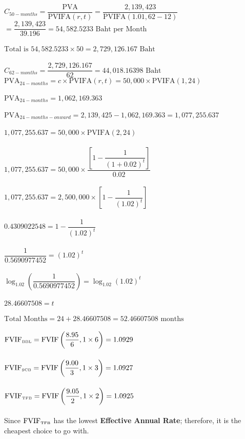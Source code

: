 \documentclass{article}
\begin{document}
\begin{outline}[enumerate]
\1 
	\2 
		$ C_{50-months} = \dfrac{\mbox{PVA}}{\mbox{PVIFA}(r, t)} = \dfrac{2,139,423}{\mbox{PVIFA}\left(1.01, 62 - 12 \right)} $
		$ 	= \dfrac{2,139,423}{39.196} = 54,582.5233 \mbox{ Baht per Month}$ \\\\
		$\mbox{Total is } 54,582.5233 \times 50 = 2,729,126.167 \mbox{ Baht}$ \\\\
		$ C_{62-months} = \dfrac{2,729,126.167}{62} = 44,018.16398 \mbox{ Baht} $
	\2 	$ \mbox{PVA}_{24-months} = c \times {\mbox{PVIFA}(r, t)} = 50,000 \times {\mbox{PVIFA}(1, 24)} $ \\\\
		$ \mbox{PVA}_{24-months} = 1,062,169.363 $ \\\\
		$ \mbox{PVA}_{24-months-onward} = 2,139,425 - 1,062,169.363 = 1,077,255.637 $ \\\\
		$ 1,077,255.637 = 50,000 \times {\mbox{PVIFA}(2, 24)} $ \\\\
		$ 1,077,255.637 = 50,000 \times \dfrac{\left[1 - \dfrac{1}{(1 + 0.02)^t}\right]}{0.02} $ \\\\
		$ 1,077,255.637 = 2,500,000 \times \left[1 - \dfrac{1}{(1.02)^t}\right] $ \\\\
		$ 0.4309022548 = 1 - \dfrac{1}{(1.02)^t} $ \\\\
		$ \dfrac{1}{0.5690977452} = (1.02)^t $ \\\\
		$ \log_{1.02}\left(\dfrac{1}{0.5690977452}\right) = \log_{1.02}(1.02)^t $ \\\\
		$ 28.46607508 = t $ \\\\
		$ \mbox{Total Months} = 24 + 28.46607508 = 52.46607508 \mbox{ months} $ \\\\

\newpage
\1
	\2 	$\mbox{FVIF}_{\tiny\mbox{BBL}} = \mbox{FVIF}\left(\dfrac{8.95}{6}, 1 \times 6\right) = 1.0929$ \\\\
		$\mbox{FVIF}_{\tiny\mbox{SCB}} = \mbox{FVIF}\left(\dfrac{9.00}{3}, 1 \times 3\right) = 1.0927$ \\\\
		$\mbox{FVIF}_{\tiny\mbox{TFB}} = \mbox{FVIF}\left(\dfrac{9.05}{2}, 1 \times 2\right) = 1.0925$ \\\\
		Since $\mbox{FVIF}_{\tiny\mbox{TFB}}$ has the lowest \textbf{Effective Annual Rate}; therefore, it is the cheapest choice to go with.\\


\end{outline}
\end{document}
